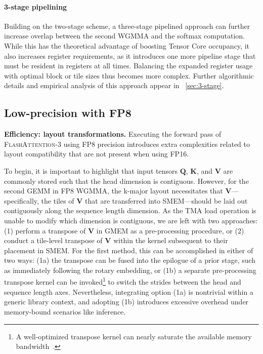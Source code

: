 \begin{enumerate}
\paragraph{3-stage pipelining} Building on the two-stage scheme, a three-stage pipelined approach can further increase overlap between the second WGMMA and the softmax computation. While this has the theoretical advantage of boosting Tensor Core occupancy, it also increases register requirements, as it introduces one more pipeline stage that must be resident in registers at all times. Balancing the expanded register usage with optimal block or tile sizes thus becomes more complex. Further algorithmic details and empirical analysis of this approach appear in ~\cref{sec:3-stage}.

\subsection{Low-precision with FP8}
\label{sec:algofp8}

\textbf{Efficiency: layout transformations.} Executing the forward pass of \textsc{FlashAttention-3} using FP8 precision introduces extra complexities related to layout compatibility that are not present when using FP16.

To begin, it is important to highlight that input tensors $\mathbf{Q}$, $\mathbf{K}$, and $\mathbf{V}$ are commonly stored such that the head dimension is contiguous. However, for the second GEMM in FP8 WGMMA, the k-major layout necessitates that $\mathbf{V}$—specifically, the tiles of $\mathbf{V}$ that are transferred into SMEM—should be laid out contiguously along the sequence length dimension. As the TMA load operation is unable to modify which dimension is contiguous, we are left with two approaches: (1) perform a transpose of $\mathbf{V}$ in GMEM as a pre-processing procedure, or (2) conduct a tile-level transpose of $\mathbf{V}$ within the kernel subsequent to their placement in SMEM. For the first method, this can be accomplished in either of two ways: (1a) the transpose can be fused into the epilogue of a prior stage, such as immediately following the rotary embedding, or (1b) a separate pre-processing transpose kernel can be invoked\footnote{A well-optimized transpose kernel can nearly saturate the available memory bandwidth~\citep{colfax_cutlass_transpose_2024}.} to switch the strides between the head and sequence length axes. Nevertheless, integrating option (1a) is nontrivial within a generic library context, and adopting (1b) introduces excessive overhead under memory-bound scenarios like inference.


\end{enumerate}
